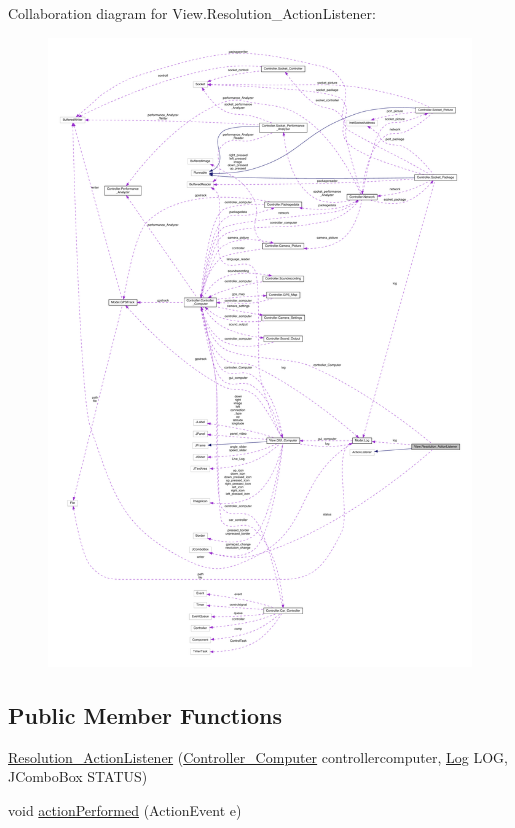 Collaboration diagram for View.\+Resolution\+\_\+\+Action\+Listener\+:
\nopagebreak
\begin{figure}[H]
\begin{center}
\leavevmode
\includegraphics[width=350pt]{class_view_1_1_resolution___action_listener__coll__graph}
\end{center}
\end{figure}
\subsection*{Public Member Functions}
\begin{DoxyCompactItemize}
\item 
\hyperlink{class_view_1_1_resolution___action_listener_a6569310f820f71feb6e541b39eff1c61}{Resolution\+\_\+\+Action\+Listener} (\hyperlink{class_controller_1_1_controller___computer}{Controller\+\_\+\+Computer} controllercomputer, \hyperlink{class_model_1_1_log}{Log} L\+O\+G, J\+Combo\+Box S\+T\+A\+T\+U\+S)
\item 
void \hyperlink{class_view_1_1_resolution___action_listener_a1462cb188e57eb40397ed9d9da12c066}{action\+Performed} (Action\+Event e)
\end{DoxyCompactItemize}


